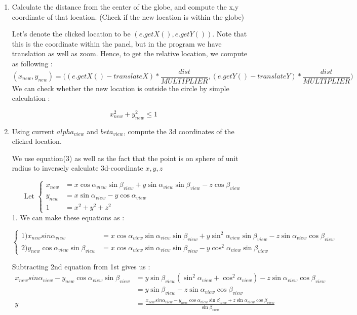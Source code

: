 \documentclass[]{article}
\begin{document}
 \begin{enumerate}
\item Calculate the distance from the center of the globe, and compute the x,y coordinate of that location. (Check if the new location is within the globe)

Let's denote the clicked location to be $(e.getX(),e.getY())$. Note that this is the coordinate within the panel, but in the program we have translation as well as zoom. Hence, to get the relative location, we compute as following : 
$$(x_{new},y_{new})=\bigg((e.getX()-translateX)*\frac{dist}{MULTIPLIER},(e.getY()-translateY)*\frac{dist}{MULTIPLIER}\bigg)$$
We can check whether the new location is outside the circle by simple calculation : 

$$x_{new}^2 + y_{new}^2 \le 1$$
 
\item Using current $alpha_{view}$ and $beta_{view}$, compute the 3d coordinates of the clicked location.

We use equation(3) as well as the fact that the point is on sphere of unit radius to inversely calculate 3d-coordinate $x,y,z$

\[ \text{Let } 
\begin{cases}
x_{new} &= x\cos \alpha_{view} \sin \beta_{view} + y\sin \alpha_{view} \sin \beta_{view} -z\cos \beta_{view}  \\ 
y_{new} &= x\sin \alpha_{view} -y\cos \alpha_{view}\\ 
1 &= x^2 + y^2 + z^2
\end{cases}
\]
1. We can make these equations as : 

\[  
\begin{cases}
1)x_{new}sin\alpha_{view} &= x\cos \alpha_{view} \sin \alpha_{view} \sin \beta_{view} + y\sin^2 \alpha_{view} \sin \beta_{view} -z\sin \alpha_{view}\cos \beta_{view}  \\ 
2)y_{new}\cos \alpha_{view} \sin \beta_{view} &= x\cos \alpha_{view}\sin \alpha_{view}  \sin \beta_{view} -y\cos^2 \alpha_{view} \sin \beta_{view}
\end{cases}
\]

Subtracting 2nd equation from 1st gives us : \begin{equation*}
\begin{split}
x_{new}sin\alpha_{view} - y_{new}\cos \alpha_{view} \sin \beta_{view} &= y\sin \beta_{view}(\sin^2 \alpha_{view} + \cos^2 \alpha_{view})-z\sin \alpha_{view} \cos \beta_{view}\\
&=y\sin \beta_{view}-z\sin \alpha_{view} \cos \beta_{view}\\
y&=\frac{x_{new}sin\alpha_{view} - y_{new}\cos \alpha_{view} \sin \beta_{view}+z\sin \alpha_{view} \cos \beta_{view}}{\sin \beta_{view}}
\end{split}
\end{equation*}


\end{enumerate}
\end{document}
